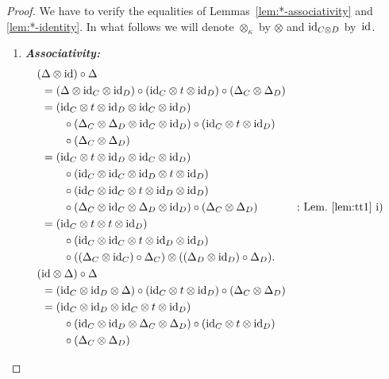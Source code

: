 \begin{proof}
    We have to verify the equalities of Lemmas~\ref{lem:*-associativity} and \ref{lem:*-identity}. In what follows we will denote $\otimes_\kappa$ by $\otimes$ and $\text{\rm id}_{C\otimes D}$ by~$\text{\rm id}$.

    \begin{enumerate}[-]
    \item \textbf{\textit{Associativity:}}
    \small
    \begin{align*}
        (&\Delta\otimes\id)\circ\Delta\\
        &= (\Delta\otimes\id_C\otimes\id_D)
            \circ
            (\id_C\otimes t\otimes\id_D)\circ(\Delta_C\otimes\Delta_D)\\
        &= (\id_C\otimes t\otimes\id_D\otimes\id_C\otimes\id_D)\\
        &\qquad\circ(\Delta_C\otimes\Delta_D\otimes\id_C\otimes\id_D)
            \circ(\id_C\otimes t\otimes\id_D)\\
        &\qquad\circ(\Delta_C\otimes\Delta_D)\\
        &= (\id_C\otimes t\otimes\id_D\otimes\id_C\otimes\id_D)\\
        &\qquad\circ(\id_C\otimes\id_C\otimes\id_D\otimes t\otimes\id_D)\\
        &\qquad\circ(\id_C\otimes\id_C\otimes t\otimes\id_D\otimes\id_D)\\
        &\qquad\circ(\Delta_C\otimes\id_C\otimes\Delta_D\otimes\id_D)
            \circ(\Delta_C\otimes\Delta_D)
            &&\text{; Lem.~\ref{lem:tt1}~i)}\\
        &= (\id_C\otimes t\otimes t\otimes\id_D)\\
        &\qquad\circ(\id_C\otimes\id_C\otimes t\otimes\id_D\otimes\id_D)\\
        &\qquad\circ((\Delta_C\otimes\id_C)\circ\Delta_C)
            \otimes((\Delta_D\otimes\id_D)\circ\Delta_D).\\
        (&\id\otimes\Delta)\circ\Delta\\
        &= (\id_C\otimes\id_D\otimes\Delta)
            \circ(\id_C\otimes t\otimes\id_D)
            \circ(\Delta_C\otimes\Delta_D)\\
        &= (\id_C\otimes\id_D\otimes\id_C\otimes t\otimes\id_D)\\
        &\qquad\circ(\id_C\otimes\id_D\otimes\Delta_C\otimes\Delta_D)
            \circ(\id_C\otimes t\otimes\id_D)\\
        &\qquad\circ(\Delta_C\otimes\Delta_D)\\

\end{align*}
\end{enumerate}
\end{proof}
